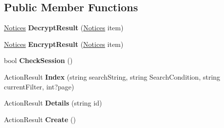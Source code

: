 \subsection*{Public Member Functions}
\begin{DoxyCompactItemize}
\item 
\hyperlink{class_cloud_bread_admin_web_1_1_notices}{Notices} {\bfseries Decrypt\+Result} (\hyperlink{class_cloud_bread_admin_web_1_1_notices}{Notices} item)\hypertarget{class_cloud_bread_admin_web_1_1_controllers_1_1_notices_controller_a29973b1ebd8717572f53a22553e4f9f7}{}\label{class_cloud_bread_admin_web_1_1_controllers_1_1_notices_controller_a29973b1ebd8717572f53a22553e4f9f7}

\item 
\hyperlink{class_cloud_bread_admin_web_1_1_notices}{Notices} {\bfseries Encrypt\+Result} (\hyperlink{class_cloud_bread_admin_web_1_1_notices}{Notices} item)\hypertarget{class_cloud_bread_admin_web_1_1_controllers_1_1_notices_controller_ad9878204be29e2d79a477e00bcb47b94}{}\label{class_cloud_bread_admin_web_1_1_controllers_1_1_notices_controller_ad9878204be29e2d79a477e00bcb47b94}

\item 
bool {\bfseries Check\+Session} ()\hypertarget{class_cloud_bread_admin_web_1_1_controllers_1_1_notices_controller_a829abaa9f9035347d7b8129723c8c883}{}\label{class_cloud_bread_admin_web_1_1_controllers_1_1_notices_controller_a829abaa9f9035347d7b8129723c8c883}

\item 
Action\+Result {\bfseries Index} (string search\+String, string Search\+Condition, string current\+Filter, int?page)\hypertarget{class_cloud_bread_admin_web_1_1_controllers_1_1_notices_controller_a264bba593edb15c30004d90159209440}{}\label{class_cloud_bread_admin_web_1_1_controllers_1_1_notices_controller_a264bba593edb15c30004d90159209440}

\item 
Action\+Result {\bfseries Details} (string id)\hypertarget{class_cloud_bread_admin_web_1_1_controllers_1_1_notices_controller_a54f10c1b319ee8947f41103b2ba43541}{}\label{class_cloud_bread_admin_web_1_1_controllers_1_1_notices_controller_a54f10c1b319ee8947f41103b2ba43541}

\item 
Action\+Result {\bfseries Create} ()\hypertarget{class_cloud_bread_admin_web_1_1_controllers_1_1_notices_controller_ad8e2f8a6f4b9701a901b1d8dd466535b}{}\label{class_cloud_bread_admin_web_1_1_controllers_1_1_notices_controller_ad8e2f8a6f4b9701a901b1d8dd466535b}


\end{DoxyCompactItemize}
